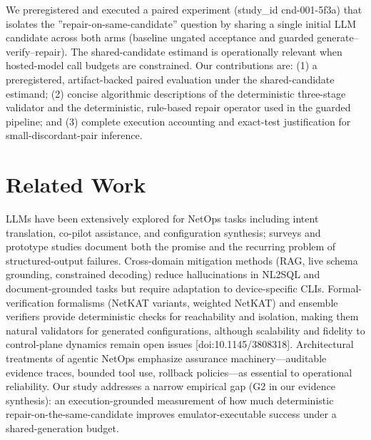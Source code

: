 \documentclass[conference]{IEEEtran}
\begin{document}
We preregistered and executed a paired experiment (study\_id cnd-001-5f3a) that isolates the ''repair-on-same-candidate'' question by sharing a single initial LLM candidate across both arms (baseline ungated acceptance and guarded generate--verify--repair). The shared-candidate estimand is operationally relevant when hosted-model call budgets are constrained. Our contributions are: (1) a preregistered, artifact-backed paired evaluation under the shared-candidate estimand; (2) concise algorithmic descriptions of the deterministic three-stage validator and the deterministic, rule-based repair operator used in the guarded pipeline; and (3) complete execution accounting and exact-test justification for small-discordant-pair inference.

\section{Related Work}
LLMs have been extensively explored for NetOps tasks including intent translation, co-pilot assistance, and configuration synthesis; surveys and prototype studies document both the promise and the recurring problem of structured-output failures. Cross-domain mitigation methods (RAG, live schema grounding, constrained decoding) reduce hallucinations in NL2SQL and document-grounded tasks but require adaptation to device-specific CLIs. Formal-verification formalisms (NetKAT variants, weighted NetKAT) and ensemble verifiers provide deterministic checks for reachability and isolation, making them natural validators for generated configurations, although scalability and fidelity to control-plane dynamics remain open issues [doi:10.1145/3808318]. Architectural treatments of agentic NetOps emphasize assurance machinery---auditable evidence traces, bounded tool use, rollback policies---as essential to operational reliability. Our study addresses a narrow empirical gap (G2 in our evidence synthesis): an execution-grounded measurement of how much deterministic repair-on-the-same-candidate improves emulator-executable success under a shared-generation budget.
\end{document}
